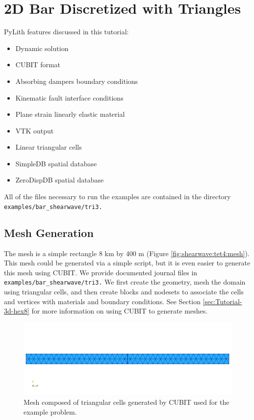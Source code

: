 
\section{\label{sec:tutorial:shearwave:tri3}2D Bar Discretized with Triangles}

PyLith features discussed in this tutorial:
\begin{itemize}
\item Dynamic solution
\item CUBIT format
\item Absorbing dampers boundary conditions
\item Kinematic fault interface conditions
\item Plane strain linearly elastic material
\item VTK output
\item Linear triangular cells
\item SimpleDB spatial database
\item ZeroDispDB spatial database
\end{itemize}
All of the files necessary to run the examples are contained in the
directory \texttt{examples/bar\_shearwave/tri3.}


\subsection{Mesh Generation}

The mesh is a simple rectangle 8 km by 400 m (Figure \ref{fig:shearwave:tet4:mesh}).
This mesh could be generated via a simple script, but it is even easier
to generate this mesh using CUBIT. We provide documented journal files
in \texttt{examples/bar\_shearwave/tri3.} We first create the geometry,
mesh the domain using triangular cells, and then create blocks and
nodesets to associate the cells and vertices with materials and boundary
conditions. See Section \ref{sec:Tutorial-3d-hex8} for more information
on using CUBIT to generate meshes.

\noindent \begin{center}
\begin{figure}
\begin{centering}
\includegraphics[scale=0.5]{tutorials/shearwave/figs/tri3mesh}
\par\end{centering}

\caption{Mesh composed of triangular cells generated by CUBIT used for the
example problem.\label{fig:shearwave:tri3:mesh}}
\end{figure}

\par\end{center}


